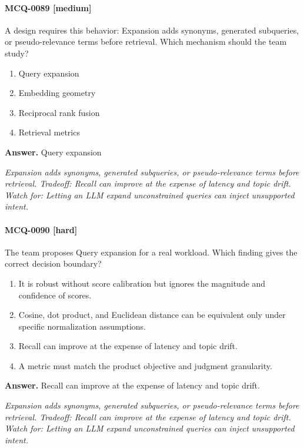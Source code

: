\paragraph{MCQ-0089 [medium]} A design requires this behavior: Expansion adds synonyms, generated subqueries, or pseudo-relevance terms before retrieval. Which mechanism should the team study?
\begin{enumerate}[label=\Alph*.]
\item Query expansion
\item Embedding geometry
\item Reciprocal rank fusion
\item Retrieval metrics
\end{enumerate}
\noindent\textbf{Answer.} Query expansion
\par\textit{Expansion adds synonyms, generated subqueries, or pseudo-relevance terms before retrieval. Tradeoff: Recall can improve at the expense of latency and topic drift. Watch for: Letting an LLM expand unconstrained queries can inject unsupported intent.}
\paragraph{MCQ-0090 [hard]} The team proposes Query expansion for a real workload. Which finding gives the correct decision boundary?
\begin{enumerate}[label=\Alph*.]
\item It is robust without score calibration but ignores the magnitude and confidence of scores.
\item Cosine, dot product, and Euclidean distance can be equivalent only under specific normalization assumptions.
\item Recall can improve at the expense of latency and topic drift.
\item A metric must match the product objective and judgment granularity.
\end{enumerate}
\noindent\textbf{Answer.} Recall can improve at the expense of latency and topic drift.
\par\textit{Expansion adds synonyms, generated subqueries, or pseudo-relevance terms before retrieval. Tradeoff: Recall can improve at the expense of latency and topic drift. Watch for: Letting an LLM expand unconstrained queries can inject unsupported intent.}
